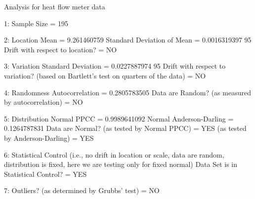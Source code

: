  
 
Analysis for heat flow meter data
 
1: Sample Size                           = 195
 
2: Location
   Mean                                  = 9.261460759
   Standard Deviation of Mean            = 0.0016319397
   95%
   Drift with respect to location?       = NO
 
3: Variation
   Standard Deviation                    = 0.0227887974
   95%
   Drift with respect to variation?
   (based on Bartlett's test on quarters
   of the data)                          = NO
 
4: Randomness
   Autocorrelation                       = 0.2805783505
   Data are Random?
     (as measured by autocorrelation)    = NO
 
5: Distribution
   Normal PPCC                           = 0.9989641092
   Normal Anderson-Darling               = 0.1264787831
   Data are Normal?
     (as tested by Normal PPCC)          = YES
     (as tested by Anderson-Darling)     = YES
 
6: Statistical Control
   (i.e., no drift in location or scale,
   data are random, distribution is 
   fixed, here we are testing only for
   fixed normal)
   Data Set is in Statistical Control?   = YES
 
7: Outliers?
   (as determined by Grubbs' test)        = NO
 
